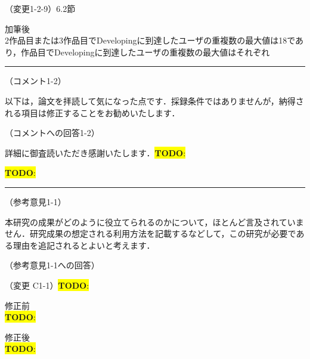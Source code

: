 \documentclass{jarticle} %
\newcommand{\todo}[1]{\colorbox{yellow}{{\bf TODO}:}{\color{blue}{\textbf{[#1]}}}}
\def\subsection#1{ \vspace{1pc} {\gt #1} }
\def\nextans{ \vspace{2pc} \hrule }
\begin{document}
\subsection{（変更1-2-9）6.2節}
\vspace{-0.3cm}
\begin{description}
\item 加筆後\\
\phantom{　}
2作品目または3作品目でDevelopingに到達したユーザの重複数の最大値は18であり，\textcolor{red}{}作品目でDevelopingに到達したユーザの重複数の最大値はそれぞれ
\end{description}

\newpage
\nextans
\subsection{（コメント1-2）}

以下は，論文を拝読して気になった点です．採録条件ではありませんが，納得される項目は修正することをお勧めいたします．

\subsection{（コメントへの回答1-2）}

詳細に御査読いただき感謝いたします．\todo{hoge}

\todo{todo}

\newpage
\nextans
\subsection{（参考意見1-1）}

本研究の成果がどのように役立てられるのかについて，ほとんど言及されていません．研究成果の想定される利用方法を記載するなどして，この研究が必要である理由を追記されるとよいと考えます．

\subsection{（参考意見1-1への回答）}

\subsection{（変更 C1-1）\todo{hoge}}
\vspace{-0.3cm}
\begin{description}
\item 修正前\\
\phantom{　}
\todo{hoge}
\vspace{-0.3cm}
\item 修正後\\
\phantom{　}
\todo{hoge}
\end{description}
\end{document}
